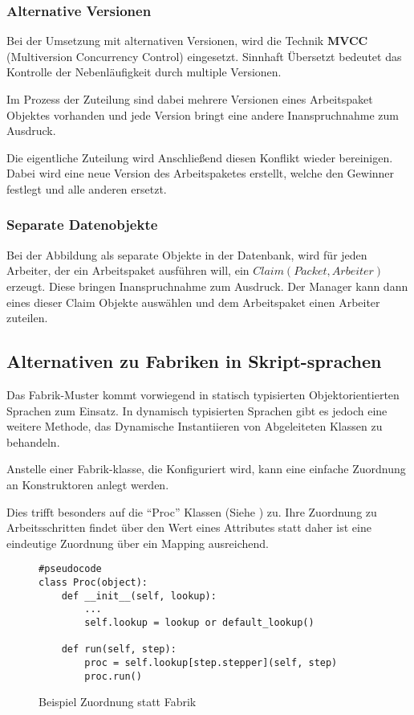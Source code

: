\subsubsection{Alternative Versionen}

Bei der Umsetzung mit alternativen Versionen, wird die Technik \textbf{MVCC} (Multiversion Concurrency Control) eingesetzt.
Sinnhaft Übersetzt bedeutet das Kontrolle der Nebenläufigkeit durch multiple Versionen.

Im Prozess der Zuteilung sind dabei mehrere Versionen eines Arbeitspaket Objektes vorhanden und jede Version bringt eine andere Inanspruchnahme zum Ausdruck.

Die eigentliche Zuteilung wird Anschließend diesen Konflikt wieder bereinigen.
Dabei wird eine neue Version des Arbeitspaketes erstellt, welche den Gewinner festlegt und alle anderen ersetzt.

\subsubsection{Separate Datenobjekte}

Bei der Abbildung als separate Objekte in der Datenbank,
wird für jeden Arbeiter, der ein Arbeitspaket ausführen will, ein $Claim(Packet, Arbeiter)$ erzeugt. Diese bringen Inanspruchnahme zum Ausdruck.
Der Manager kann dann eines dieser Claim Objekte auswählen und dem Arbeitspaket einen Arbeiter zuteilen.

\subsection{Alternativen zu Fabriken in Skript-sprachen}

Das Fabrik-Muster kommt vorwiegend in statisch typisierten Objektorientierten Sprachen zum Einsatz. In dynamisch typisierten Sprachen gibt es jedoch eine weitere Methode, das Dynamische Instantiieren von Abgeleiteten Klassen zu behandeln.

Anstelle einer Fabrik-klasse, die Konfiguriert wird,
kann eine einfache Zuordnung an Konstruktoren anlegt werden.

Dies trifft besonders auf die ``Proc'' Klassen (Siehe ) zu.
Ihre Zuordnung zu Arbeitsschritten findet über den Wert eines Attributes statt
daher ist eine eindeutige Zuordnung über ein Mapping ausreichend.

\begin{figure}
\begin{verbatim}
#pseudocode
class Proc(object):
    def __init__(self, lookup):
        ...
        self.lookup = lookup or default_lookup()

    def run(self, step):
        proc = self.lookup[step.stepper](self, step)
        proc.run()
\end{verbatim}
\caption{Beispiel Zuordnung statt Fabrik}
\end{figure}